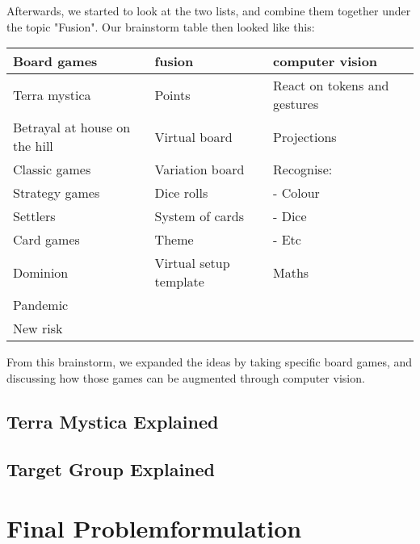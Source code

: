 Afterwards, we started to look at the two lists, and combine them together under the topic "Fusion". Our brainstorm table then looked like this:

\begin{tabular}{l | l | l}
Board games & fusion & computer vision\\
\hline
Terra mystica & Points & React on tokens and gestures\\
Betrayal at house on the hill &  Virtual board & Projections\\
Classic games & Variation board & Recognise: \\
Strategy games & Dice rolls & - Colour\\
Settlers & System of cards & - Dice\\
Card games & Theme & - Etc\\
Dominion & Virtual setup template & Maths\\
Pandemic \\
New risk\\
\end{tabular}

From this brainstorm, we expanded the ideas by taking specific board games, and discussing how those games can be augmented through computer vision.
\subsection{Terra Mystica Explained}

\subsection{Target Group Explained}

\section{Final Problemformulation}\label{sec:finalprob}
